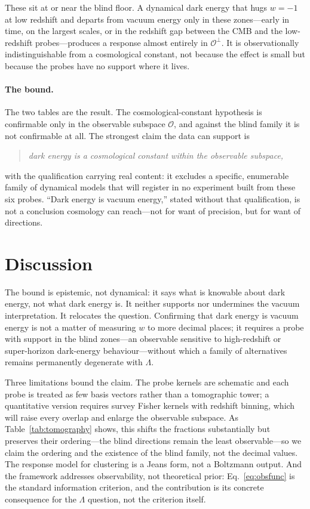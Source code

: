 \documentclass[twocolumn,10pt]{article}
\begin{document}
These sit at or near the blind floor. A dynamical dark energy that hugs $w=-1$
at low redshift and departs from vacuum energy only in these zones---early in
time, on the largest scales, or in the redshift gap between the CMB and the
low-redshift probes---produces a response almost entirely in
$\mathcal{O}^\perp$. It is observationally indistinguishable from a cosmological
constant, not because the effect is small but because the probes have no
support where it lives.

\paragraph{The bound.}
The two tables are the result. The cosmological-constant hypothesis is
confirmable only in the observable subspace $\mathcal{O}$, and against the blind
family it is not confirmable at all. The strongest claim the data can support is
\begin{quote}
\emph{dark energy is a cosmological constant within the observable subspace,}
\end{quote}
with the qualification carrying real content: it excludes a specific,
enumerable family of dynamical models that will register in no experiment built
from these six probes. ``Dark energy is vacuum energy,'' stated without that
qualification, is not a conclusion cosmology can reach---not for want of
precision, but for want of directions.

\section{Discussion}
\label{sec:disc}

The bound is epistemic, not dynamical: it says what is knowable about dark
energy, not what dark energy is. It neither supports nor undermines the vacuum
interpretation. It relocates the question. Confirming that dark energy is
vacuum energy is not a matter of measuring $w$ to more decimal places; it
requires a probe with support in the blind zones---an observable sensitive to
high-redshift or super-horizon dark-energy behaviour---without which a family of
alternatives remains permanently degenerate with $\Lambda$.

Three limitations bound the claim. The probe kernels are schematic and each
probe is treated as few basis vectors rather than a tomographic tower; a
quantitative version requires survey Fisher kernels with redshift binning, which
will raise every overlap and enlarge the observable subspace. As
Table~\ref{tab:tomography} shows, this shifts the fractions substantially but
preserves their ordering---the blind directions remain the least observable---so
we claim the ordering and the existence of the blind family, not the decimal
values. The response model for clustering is a Jeans form, not a Boltzmann
output. And the framework addresses observability, not theoretical prior:
Eq.~\eqref{eq:obsfunc} is the standard information criterion, and the
contribution is its concrete consequence for the $\Lambda$ question, not the
criterion itself.
\end{document}
